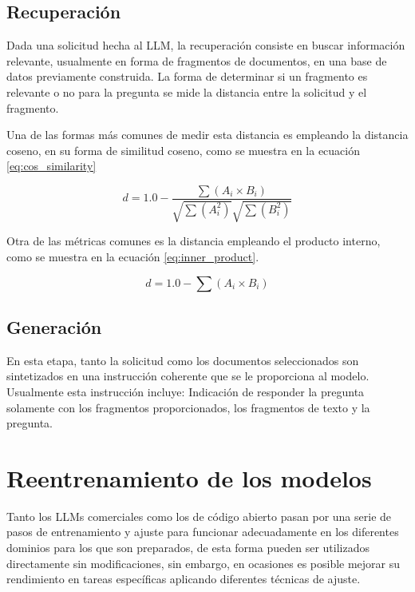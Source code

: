 \subsection{Recuperación}

Dada una solicitud hecha al LLM, la recuperación consiste
en buscar información relevante, usualmente en forma de fragmentos de
documentos, en una base de datos previamente construida. La forma de
determinar si un fragmento es relevante o no para la pregunta se mide la
distancia entre la solicitud y el fragmento.

Una de las formas más comunes de medir esta distancia es empleando la
distancia coseno, en su forma de similitud coseno, como se muestra en la
ecuación \ref{eq:cos_similarity}

\begin{equation}\label{eq:cos_similarity}
    d = 1.0 - \frac{\sum{(A_i \times B_i)}}{\sqrt{\sum{(A_i^2)}}\sqrt{\sum{(B_i^2)}}}
\end{equation}

Otra de las métricas comunes es la distancia empleando el producto interno,
como se muestra en la ecuación \ref{eq:inner_product}.

\begin{equation}\label{eq:inner_product}
    d = 1.0 - \sum{(A_i \times B_i)}
\end{equation}

\subsection{Generación}

En esta etapa, tanto la solicitud como los documentos seleccionados son
sintetizados en una instrucción coherente que se le proporciona al modelo.
Usualmente esta instrucción incluye: Indicación de responder la pregunta
solamente con los fragmentos proporcionados, los fragmentos de texto y la
pregunta.

\section{Reentrenamiento de los modelos}

Tanto los LLMs comerciales como los de código abierto pasan por una serie de
pasos de entrenamiento y ajuste para funcionar adecuadamente en los
diferentes dominios para los que son preparados, de esta forma pueden ser
utilizados directamente sin modificaciones, sin embargo, en ocasiones es
posible mejorar su rendimiento en tareas específicas aplicando diferentes
técnicas de ajuste.

